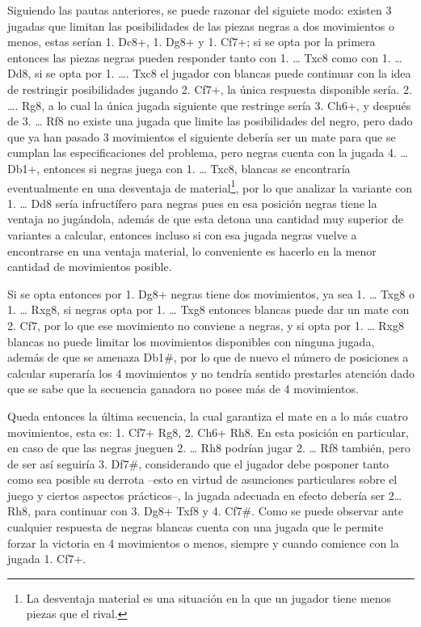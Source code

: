 \documentclass[twoside,openright,12pt,a4paper,spanish]{book}
\begin{document}
Siguiendo las pautas anteriores, se puede razonar del siguiete modo: existen 3 jugadas que limitan las posibilidades de las piezas negras a dos movimientos o menos, estas serían 1. Dc8+, 1. Dg8+ y 1. Cf7+; si se opta por la primera entonces las piezas negras pueden responder tanto con 1.  …  Txc8 como con 1. … Dd8, si se opta por 1. …. Txc8 el jugador con blancas puede continuar con la idea de restringir posibilidades jugando 2. Cf7+, la única respuesta disponible sería. 2. ….  Rg8, a lo cual la única jugada siguiente que restringe sería 3. Ch6+, y después de 3. …   Rf8 no existe una jugada que limite las posibilidades del negro, pero dado que ya han pasado 3 movimientos el siguiente debería ser un mate para que se cumplan las especificaciones del problema, pero negras cuenta con la jugada 4. … Db1+, entonces si negras juega con 1. …  Txc8, blancas se encontraría eventualmente en una desventaja de material\footnote{La desventaja material es una situación en la que un jugador tiene menos piezas que el rival.}, por lo que analizar la variante con 1. …  Dd8 sería infructífero para negras pues en esa posición negras tiene la ventaja no jugándola, además de que esta detona una cantidad muy superior de variantes a calcular, entonces incluso si con esa jugada negras vuelve a encontrarse en una ventaja material, lo conveniente es hacerlo en la menor cantidad de movimientos posible.

Si se opta entonces por 1. Dg8+ negras tiene dos movimientos, ya sea 1. … Txg8 o 1. … Rxg8, si negras opta por 1. … Txg8 entonces blancas puede dar un mate con 2. Cf7, por lo que ese movimiento no conviene a negras, y si opta por 1. … Rxg8 blancas no puede limitar los movimientos disponibles con ninguna jugada, además de que se amenaza Db1\#, por lo que de nuevo el número de posiciones a calcular superaría los 4 movimientos y no tendría sentido prestarles atención dado que se sabe que la secuencia ganadora no posee más de 4 movimientos.

Queda entonces la última secuencia, la cual garantiza el mate en a lo más cuatro movimientos, esta es: 1. Cf7+ Rg8, 2. Ch6+ Rh8. En esta posición en particular, en caso de que las negras jueguen 2. … Rh8 podrían jugar 2. … Rf8 también, pero de ser así seguiría 3. Df7\#, considerando que el jugador debe posponer tanto como sea posible su derrota --esto en virtud de asunciones particulares sobre el juego y ciertos aspectos prácticos--, la jugada adecuada en efecto debería ser 2… Rh8, para continuar con 3. Dg8+ Txf8 y 4. Cf7\#. Como se puede observar ante cualquier respuesta de negras blancas cuenta con una jugada que le permite forzar la victoria en 4 movimientos o menos, siempre y cuando comience con la jugada 1. Cf7+.
\end{document}
